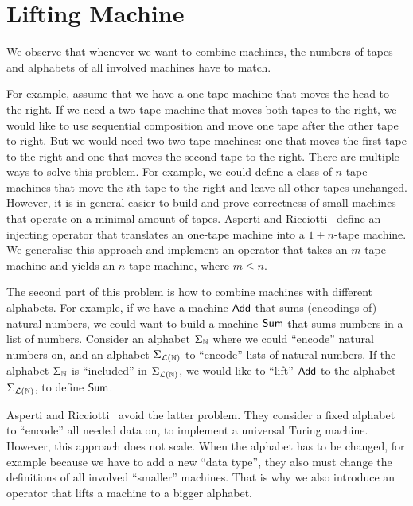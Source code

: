 \chapter{Lifting Machine}
\label{chap:lifting}

We observe that whenever we want to combine machines, the numbers of tapes and alphabets of all involved machines have to match.

For example, assume that we have a one-tape machine that moves the head to the right.  If we need a two-tape machine that moves both tapes to the
right, we would like to use sequential composition and move one tape after the other tape to right.  But we would need two two-tape machines: one that
moves the first tape to the right and one that moves the second tape to the right.  There are multiple ways to solve this problem.  For example, we
could define a class of $n$-tape machines that move the $i$th tape to the right and leave all other tapes unchanged.  However, it is in general easier
to build and prove correctness of small machines that operate on a minimal amount of tapes.  Asperti and Ricciotti~\cite{asperti2015} define an
injecting operator that translates an one-tape machine into a $1+n$-tape machine.  We generalise this approach and implement an operator that takes an
$m$-tape machine and yields an $n$-tape machine, where $m \le n$.

The second part of this problem is how to combine machines with different alphabets.  For example, if we have a machine $\mathsf{Add}$ that sums
(encodings of) natural numbers, we could want to build a machine $\mathsf{Sum}$ that sums numbers in a list of numbers.  Consider an alphabet
$\Sigma_{\mathbb{N}}$ where we could ``encode'' natural numbers on, and an alphabet $\Sigma_{\mathcal{L}(\mathbb{N})}$ to ``encode'' lists of natural numbers.  If the
alphabet $\Sigma_{\mathbb{N}}$ is ``included'' in $\Sigma_{\mathcal{L}(\mathbb{N})}$, we would like to ``lift'' $\mathsf{Add}$ to the alphabet $\Sigma_{\mathcal{L}(\mathbb{N})}$, to
define $\mathsf{Sum}$.

Asperti and Ricciotti~\cite{asperti2015} avoid the latter problem.  They consider a fixed alphabet to ``encode'' all needed data on, to implement a
universal Turing machine.  However, this approach does not scale.  When the alphabet has to be changed, for example because we have to add a new
``data type'', they also must change the definitions of all involved ``smaller'' machines.  That is why we also introduce an operator that lifts a
machine to a bigger alphabet.


